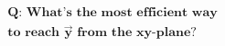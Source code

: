 \documentclass[preview]{standalone}
\begin{document}
\begin{align*}
\textbf{Q: What's the most efficient way} \\ \textbf{to reach} \,\, \mathbf{\vec{y}} \,\, \textbf{from the xy-plane?}
\end{align*}
\end{document}
